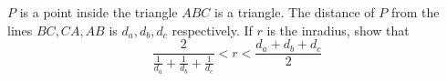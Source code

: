 $P$ is a point inside the triangle $ABC$ is a triangle. The distance of $P$ from the lines $BC, CA, AB$ is $d_a, d_b, d_c$ respectively. If $r$ is the inradius, show that $$\frac{2}{ \frac{1}{d_a} + \frac{1}{d_b} + \frac{1}{d_c}} < r < \frac{d_a + d_b + d_c}{2}$$